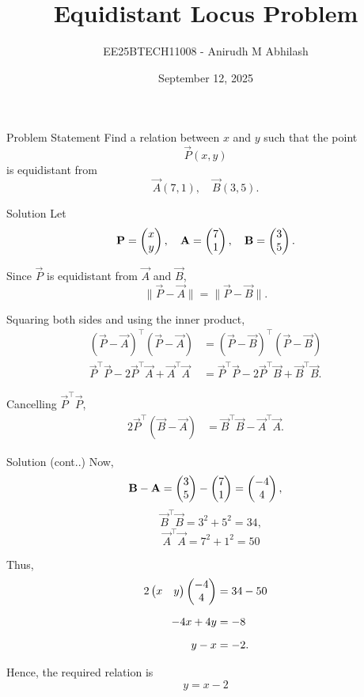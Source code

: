 \documentclass{beamer}
\title{Equidistant Locus Problem}
\author{EE25BTECH11008 - Anirudh M Abhilash}
\date{September 12, 2025}
\begin{document}
\begin{frame}
\titlepage
\end{frame}

\begin{frame}{Problem Statement}
Find a relation between $x$ and $y$ such that the point
\[
\vec{P}(x,y)
\]
is equidistant from
\[
\vec{A}(7,1), \quad \vec{B}(3,5).
\]
\end{frame}

\begin{frame}{Solution}
Let 
\[
\mathbf{P} = \begin{pmatrix}x \\ y\end{pmatrix}, \quad \mathbf{A} = \begin{pmatrix}7 \\ 1\end{pmatrix}, \quad \mathbf{B} = \begin{pmatrix}3 \\ 5\end{pmatrix}.
\]

Since $\vec{P}$ is equidistant from $\vec{A}$ and $\vec{B}$,
\[
\|\vec{P} - \vec{A}\| = \|\vec{P} - \vec{B}\|.
\]

Squaring both sides and using the inner product,
\begin{align}
(\vec{P} - \vec{A})^\top(\vec{P} - \vec{A}) &= (\vec{P} - \vec{B})^\top(\vec{P} - \vec{B}) \\[6pt]
\vec{P}^\top \vec{P} - 2\vec{P}^\top \vec{A} + \vec{A}^\top \vec{A} 
&= \vec{P}^\top \vec{P} - 2\vec{P}^\top \vec{B} + \vec{B}^\top \vec{B}.
\end{align}

Cancelling $\vec{P}^\top \vec{P}$,
\begin{align}
2\vec{P}^\top(\vec{B}-\vec{A}) &= \vec{B}^\top \vec{B} - \vec{A}^\top \vec{A}.
\end{align}

\end{frame}

\begin{frame}{Solution (cont..)}
Now,
\[
\mathbf{B} - \mathbf{A} = \begin{pmatrix}3 \\ 5\end{pmatrix} - \begin{pmatrix}7 \\ 1\end{pmatrix} = \begin{pmatrix}-4 \\ 4\end{pmatrix}, 
\]
\[
\quad \vec{B}^\top \vec{B} = 3^2 + 5^2 = 34, 
\]
\[
\quad \vec{A}^\top \vec{A} = 7^2 + 1^2 = 50
\]

Thus,
\begin{align}
2\begin{pmatrix}x & y\end{pmatrix}\begin{pmatrix}-4 \\ 4\end{pmatrix} &= 34 - 50 \\[6pt]
-4x + 4y &= -8 \\[6pt]
y - x &= -2.
\end{align}

Hence, the required relation is
\[
\boxed{y = x - 2}
\]

\end{frame}
\end{document}
